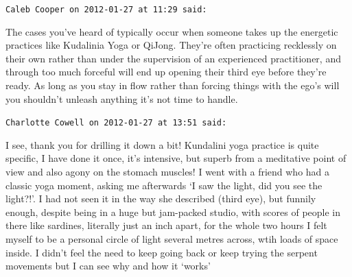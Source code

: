 \begin{footnotesize}
\begin{sffamily}
\hfill

\texttt{Caleb Cooper on 2012-01-27 at 11:29 said: }

The cases you've heard of typically occur when someone takes up the energetic practices like Kudalinia Yoga or QiJong. They're often practicing recklessly on their own rather than under the supervision of an experienced practitioner, and through too much forceful will end up opening their third eye before they're ready. As long as you stay in flow rather than forcing things with the ego's will you shouldn't unleash anything it's not time to handle.


\hfill

\texttt{Charlotte Cowell on 2012-01-27 at 13:51 said: }

I see, thank you for drilling it down a bit! Kundalini yoga practice is quite specific, I have done it once, it's intensive, but superb from a meditative point of view and also agony on the stomach muscles! I went with a friend who had a classic yoga moment, asking me afterwards `I saw the light, did you see the light?!'. I had not seen it in the way she described (third eye), but funnily enough, despite being in a huge but jam-packed studio, with scores of people in there like sardines, literally just an inch apart, for the whole two hours I felt myself to be a personal circle of light several metres across, wtih loads of space inside. I didn't feel the need to keep going back or keep trying the serpent movements but I can see why and how it `works'


\hfill

\end{sffamily}\end{footnotesize}
